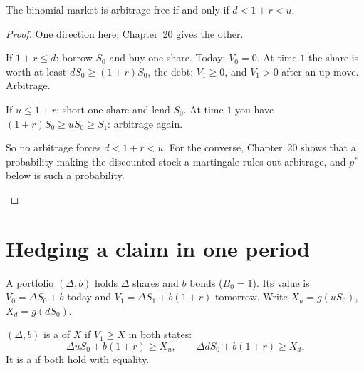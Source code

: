\begin{result}
\label{res:binomial-na}
The binomial market is arbitrage-free if and only if $d<1+r<u$.
\end{result}
\begin{proof}
One direction here; Chapter~20 gives the other.
\begin{steps}
  \item If $1+r\le d$: borrow $S_0$ and buy one share. Today: $V_0=0$. At time $1$ the share is worth at least $dS_0\ge(1+r)S_0$, the debt: $V_1\ge0$, and $V_1>0$ after an up-move. Arbitrage.
  \item If $u\le1+r$: short one share and lend $S_0$. At time $1$ you have $(1+r)S_0\ge uS_0\ge S_1$: arbitrage again.
  \item So no arbitrage forces $d<1+r<u$. For the converse, Chapter~20 shows that a probability making the discounted stock a martingale rules out arbitrage, and $p^*$ below is such a probability. \qedhere
\end{steps}
\end{proof}

\section{Hedging a claim in one period}

A portfolio $(\Delta,b)$ holds $\Delta$ shares and $b$ bonds ($B_0=1$). Its value is $V_0=\Delta S_0+b$ today and $V_1=\Delta S_1+b(1+r)$ tomorrow. Write $X_u=g(uS_0)$, $X_d=g(dS_0)$.

\begin{definition}
$(\Delta,b)$ is a  of $X$ if $V_1\ge X$ in both states:
\[
  \Delta uS_0+b(1+r)\ge X_u,\qquad \Delta dS_0+b(1+r)\ge X_d .
\]
It is a  if both hold with equality.
\end{definition}

